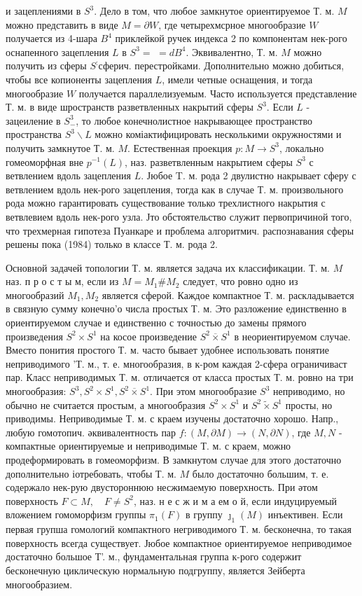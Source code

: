 \documentclass[10pt]{article}
\begin{document}
и зацеплениями в $S^{3}$. Дело в том, что любое замкнутое ориентируемое Т. м. $M$ можно представить в виде $M=\partial W$, где четырехмсрное многообразие $W$ получается из 4-шара $B^{4}$ приклейкой ручек индекса 2 по компонентам нек-рого оснапенного зацепления $L$ в $S^{3}=$ $=d B^{4}$. Эквивалентно, Т. м. $M$ можно получить из сферы $S^{:}$сферич. перестройками. Дополнительно можно добиться, чтобы все копионенты зацепления $L$, имели четные оснащения, и тогда многообразие $W$ получается параллелизуемым. Часто используется представление Т. м. в виде шространств разветвленных накрытий сферы $S^{3}$. Если $L$ - зацеиление в $S_{-}^{3}$, то любое конечнолистное накрывающее пространство пространства $S^{3} \backslash L$ можно коміактифицировать несколькими окружностями и получить замкнутое Т. м. $M$. Естественная проекция $p: M \rightarrow S^{3}$, локально гомеоморфная вне $p^{-1}(L)$, наз. разветвленным накрытием сферы $S^{3}$ с ветвлением вдоль зацепления $L$. Јюбое T. м. рода 2 двулистно накрывает сферу с ветвлением вдоль нек-рого зацепления, тогда как в случае Т. м. произвольного рода можно гарантировать существование только трехлистного накрытия с ветвлевием вдоль нек-рого узла. Јто обстоятельство служит первопричиной того, что трехмерная гипотеза Пуанкаре и проблема алгоритмич. распознавания сферы решены пока (1984) только в классе Т. м. рода 2.



Основной задачей топологии Т. м. является задача их классификации. Т. м. $M$ наз. п р о с т ы м, если из $M=M_{1} \# M_{2}$ следует, что ровно одно из многообразий $M_{1}, M_{2}$ является сферой. Каждое компактное Т. м. раскладывается в связную сумму конечно'о числа простых Т. м. Это разложение единственно в ориентируемом случае и единственно с точностью до замены прямого произведения $S^{2} \times S^{1}$ на косое произведение $S^{2} \overline{\times} S^{1}$ в неориентируемом случае. Вместо понития простого Т. м. часто бывает удобнее использовать понятие неприводимого 'Т. м., т. е. многообразия, в к-ром каждая 2-сфера ограничиваст пар. Класс неприводимых Т. м. отличается от класса простых Т. м. ровно на три многообразия: $S^{3}, S^{2} \times S^{1}, S^{2} \overline{\times} S^{1}$. При этом многообразие $S^{3}$ неприводимо, но обычно не считается простым, а многообразия $S^{2} \times S^{1}$ и $S^{2} \widetilde{\times} S^{1}$ просты, но приводимы. Неприводимые Т. м. с краем изучены достаточно хорошо. Напр., любую гомотопич. әквивалентность пар $f:(M, \partial M) \rightarrow(N, \partial N)$, где $M, N$ - компактные ориентируемые и неприводимые Т. м. с краем, можно продеформировать в гомеоморфизм. В замкнутом случае для этого достаточно дополнительно іотребовать, чтобы Т. м. $M$ было достаточно большим, т. е. содержало нек-рую двустороннюю несжимаемую поверхность. При әтом поверхность $F \subset M, \quad F \neq S^{2}$, наз. н е с ж и м а ем о й, если индуцируемый вложением гомоморфизм группы $\pi_{1}(F)$ в группу $\jmath_{1}(M)$ инъективен. Если первая групша гомологий компактного негриводимого Т. м. бесконечна, то такая поверхность всегда существует. Јюбое компактное ориентируемое неприводимое достаточно большое Т'. м., фундаментальная группа к-рого содержит бесконечную циклическую нормальную подгруппу, является Зейберта многообразием.
\end{document}

